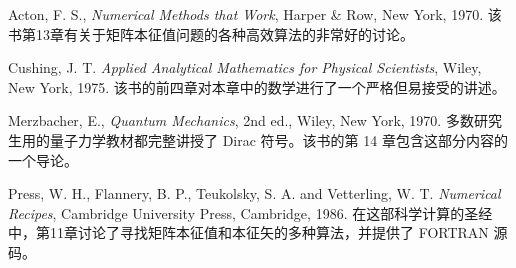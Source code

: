 \begin{description}
 \item{Acton, F. S., \textit{Numerical Methods that Work}, Harper \& Row, New York, 1970.} 该书第13章有关于矩阵本征值问题的各种高效算法的非常好的讨论。
 \item{Cushing, J. T. \textit{Applied Analytical Mathematics for Physical Scientists}, Wiley, New York, 1975.} 该书的前四章对本章中的数学进行了一个严格但易接受的讲述。
 \item{Merzbacher, E., \textit{Quantum Mechanics}, 2nd ed., Wiley, New York, 1970.} 多数研究生用的量子力学教材都完整讲授了 Dirac 符号。该书的第 14 章包含这部分内容的一个导论。
 \item{Press, W. H., Flannery, B. P., Teukolsky, S. A. and Vetterling, W. T. \textit{Numerical Recipes}, Cambridge University Press, Cambridge, 1986.} 在这部科学计算的圣经中，第11章讨论了寻找矩阵本征值和本征矢的多种算法，并提供了 FORTRAN 源码。
\end{description}